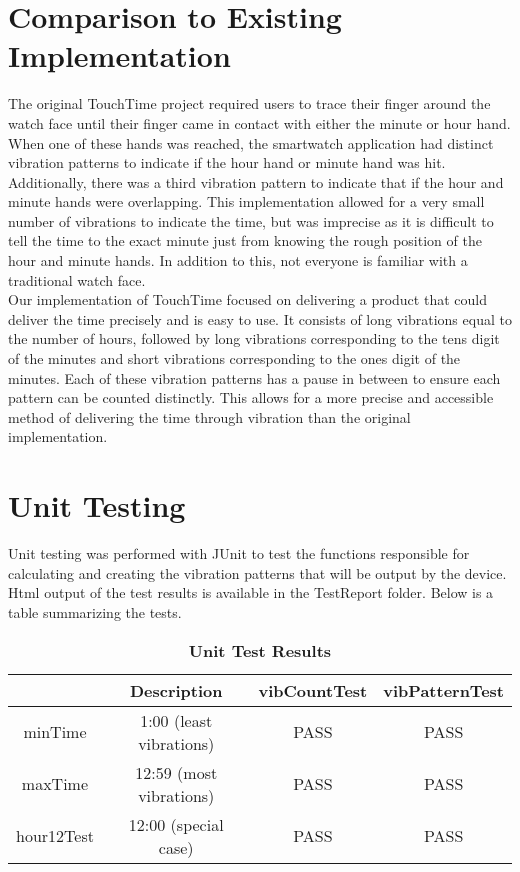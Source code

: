 \documentclass[12pt, titlepage]{article}
\begin{document}
\section{Comparison to Existing Implementation}	

The original TouchTime project required users to trace their finger around the watch face until their finger came in contact with either the minute or hour hand. When one of these hands was reached, the smartwatch application had distinct vibration patterns to indicate if the hour hand or minute hand was hit. Additionally, there was a third vibration pattern to indicate that if the hour and minute hands were overlapping. This implementation allowed for a very small number of vibrations to indicate the time, but was imprecise as it is difficult to tell the time to the exact minute just from knowing the rough position of the hour and minute hands. In addition to this, not everyone is familiar with a traditional watch face.\\
\newline
\noindent
Our implementation of TouchTime focused on delivering a product that could deliver the time precisely and is easy to use. It consists of long vibrations equal to the number of hours, followed by long vibrations corresponding to the tens digit of the minutes and short vibrations corresponding to the ones digit of the minutes. Each of these vibration patterns has a pause in between to ensure each pattern can be counted distinctly. This allows for a more precise and accessible method of delivering the time through vibration than the original implementation.

\section{Unit Testing}
Unit testing was performed with JUnit to test the functions responsible for calculating and creating the vibration patterns that will be output by the device.
Html output of the test results is available in the TestReport folder. Below is a table summarizing the tests.

\begin{table}[htb]
\caption{\textbf{Unit Test Results}} \label{Table}
\centering
\begin{tabular}{ |c|c|c|c| }
\hline
& Description & vibCountTest & vibPatternTest\\
\hline
minTime & 1:00 (least vibrations) & PASS & PASS\\
maxTime & 12:59 (most vibrations) & PASS & PASS\\
hour12Test & 12:00 (special case) & PASS & PASS\\
\hline
\end{tabular}
\end{table}
\end{document}
